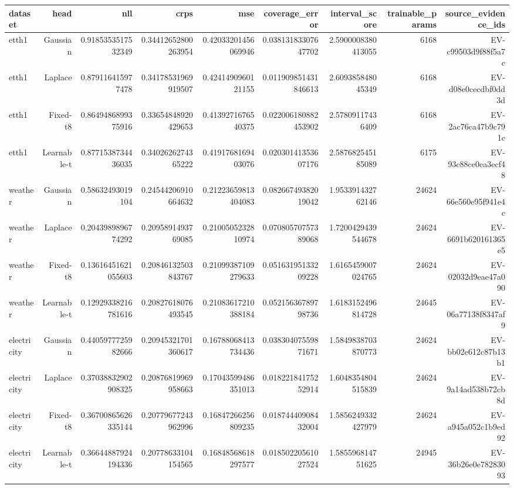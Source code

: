 \begin{tabular}{lrrrrrrrr}
\toprule
dataset & head & nll & crps & mse & coverage\_error & interval\_score & trainable\_params & source\_evidence\_ids \\
\midrule
etth1 & Gaussian & 0.9185353517532349 & 0.34412652800263954 & 0.42033201456069946 & 0.03813183307647702 & 2.5900008380413055 & 6168 & EV-c99503d9f88f5a7c \\
etth1 & Laplace & 0.879116415977478 & 0.34178531969919507 & 0.4241490960121155 & 0.011909851431846613 & 2.609385848045349 & 6168 & EV-d08e0cecdbf0dd3d \\
etth1 & Fixed-t8 & 0.8649486899375916 & 0.33654848920429653 & 0.4139271676540375 & 0.022006180882453902 & 2.57809117436409 & 6168 & EV-2ac76ca47b9c791c \\
etth1 & Learnable-t & 0.8771538734436035 & 0.3402626274365222 & 0.4191768169403076 & 0.02030141353607176 & 2.587682545185089 & 6175 & EV-93c88ce0ea3ecf48 \\
weather & Gaussian & 0.58632493019104 & 0.24544206910664632 & 0.21223659813404083 & 0.08266749382019042 & 1.953391432762146 & 24624 & EV-66e560e95f941e4c \\
weather & Laplace & 0.2043989896774292 & 0.2095891493769085 & 0.2100505232810974 & 0.07080570757389068 & 1.7200429439544678 & 24624 & EV-6691b620161365e5 \\
weather & Fixed-t8 & 0.13616451621055603 & 0.20846132503843767 & 0.21099387109279633 & 0.05163195133209228 & 1.6165459007024765 & 24624 & EV-02032d9eae47a090 \\
weather & Learnable-t & 0.12929338216781616 & 0.20827618076493545 & 0.21083617210388184 & 0.05215636789798736 & 1.6183152496814728 & 24645 & EV-06a77138f8347af9 \\
electricity & Gaussian & 0.4405977725982666 & 0.20945321701360617 & 0.16788068413734436 & 0.03830407559871671 & 1.5849838703870773 & 24624 & EV-bb02e612c87b13b1 \\
electricity & Laplace & 0.37038832902908325 & 0.20876819969958663 & 0.17043599486351013 & 0.01822184175252914 & 1.6048354804515839 & 24624 & EV-9a14ad538b72cb8d \\
electricity & Fixed-t8 & 0.36700865626335144 & 0.20779677243962996 & 0.16847266256809235 & 0.01874440908432004 & 1.5856249332427979 & 24624 & EV-a945a052c1b9ed92 \\
electricity & Learnable-t & 0.36644887924194336 & 0.20778633104154565 & 0.16848568618297577 & 0.01850220561027524 & 1.585596814751625 & 24945 & EV-36b26e0e78283093 \\
\bottomrule
\end{tabular}
